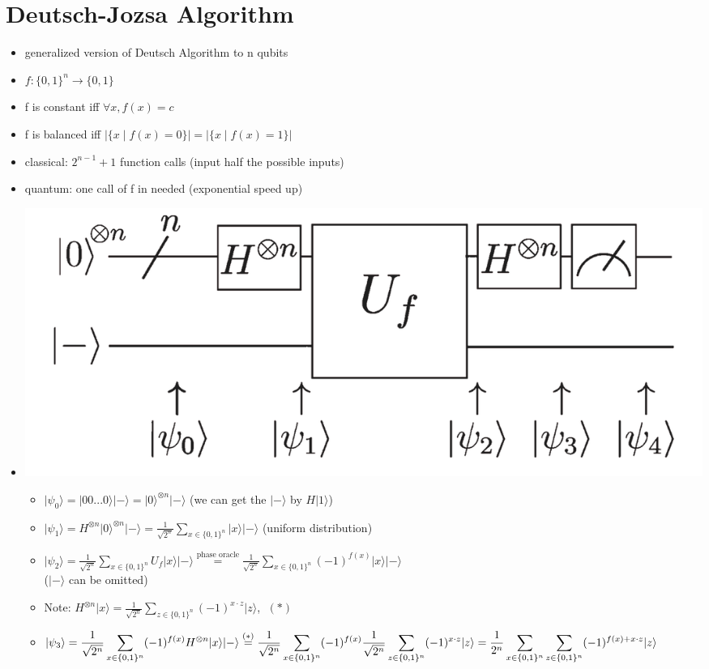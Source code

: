 \documentclass[12pt,a4paper]{article}
\newcommand{\ecb}[1]{\{#1\}}
\newcommand{\ket}[1]{\vert #1 \rangle}
\begin{document}
\section{Deutsch-Jozsa Algorithm}
\begin{itemize}
\item generalized version of Deutsch Algorithm to n qubits
\item $f : \ecb{0,1}^n \rightarrow \ecb{0,1}$
\item f is constant iff $\forall x, f(x) = c$
\item f is balanced iff $|\ecb{x \mid f(x) = 0}| = |\ecb{x \mid f(x) = 1}|$
\item classical: $2^{n-1}+1$ function calls (input half the possible inputs)
\item quantum: one call of f in needed (exponential speed up)
\item \includegraphics[scale=0.3]{./resources/jozsaplan.png}
\begin{itemize}
\item $\ket{\psi_0} = \ket{00...0}\ket{-} = \ket{0}^{\otimes n}\ket{-}$ (we can get the $\ket{-}$ by $H\ket{1}$)
\item $\displaystyle \ket{\psi_1} = H^{\otimes n}\ket{0}^{\otimes n}\ket{-} = \frac{1}{\sqrt{2^n}} \sum_{x\in\ecb{0,1}^n} \ket{x}\ket{-}$ (uniform distribution)
\item $\displaystyle \ket{\psi_2} = \frac{1}{\sqrt{2^n}} \sum_{x\in\ecb{0,1}^n}U_f\ket{x}\ket{-} \overset{\text{phase oracle}}{=} \frac{1}{\sqrt{2^n}} \sum_{x\in\ecb{0,1}^n} (-1)^{f(x)}\ket{x}\ket{-}$\\($\ket{-}$ can be omitted)
\item Note: $\displaystyle H^{\otimes n}\ket{x} = \frac{1}{\sqrt{2^n}} \sum_{z\in\ecb{0,1}^n} (-1)^{x\cdot z} \ket{z}$, $\; (\ast)$
\item $\displaystyle \ket{\psi_3} = \frac{1}{\sqrt{2^n}} \sum_{x\in\ecb{0,1}^n} (-1)^{f(x)}H^{\otimes n}\ket{x}\ket{-}\\\overset{(\ast)}{=}
\frac{1}{\sqrt{2^n}} \sum_{x\in\ecb{0,1}^n} (-1)^{f(x)}\frac{1}{\sqrt{2^n}} \sum_{z\in\ecb{0,1}^n} (-1)^{x\cdot z} \ket{z}\\= \frac{1}{2^n}\sum_{x\in\ecb{0,1}^n}\sum_{z\in\ecb{0,1}^n} (-1)^{f(x)+x\cdot z} \ket{z}$

\end{itemize}
\end{itemize}
\end{document}
